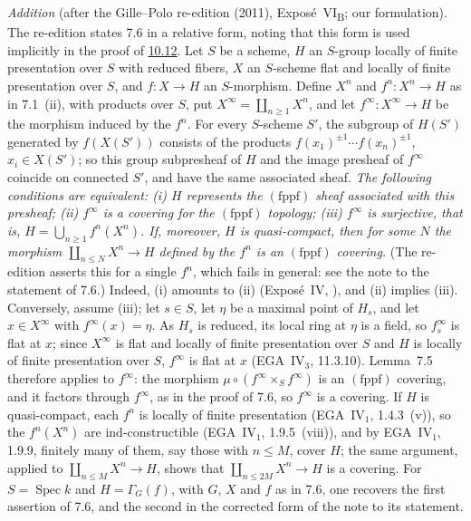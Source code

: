 \medskip\noindent
\emph{Addition} (after the Gille--Polo re-edition (2011), Exposé~VI\textsubscript{B}; our
formulation). The re-edition states 7.6 in a relative form, noting that this form is used implicitly in
the proof of \hyperref[prop:sga3-VIB-10.12]{10.12}. Let \(S\) be a scheme, \(H\) an \(S\)-group locally of
finite presentation over \(S\) with reduced fibers, \(X\) an \(S\)-scheme flat and locally of finite
presentation over \(S\), and \(f\colon X\to H\) an \(S\)-morphism. Define \(X^n\) and \(f^n\colon X^n\to H\)
as in 7.1~(ii), with products over \(S\), put \(X^\infty=\coprod_{n\geq1}X^n\), and let
\(f^\infty\colon X^\infty\to H\) be the morphism induced by the \(f^n\). For every \(S\)-scheme \(S'\), the
subgroup of \(H(S')\) generated by \(f(X(S'))\) consists of the products
\(f(x_1)^{\pm1}\cdots f(x_n)^{\pm1}\), \(x_i\in X(S')\); so this group subpresheaf of \(H\) and the image
presheaf of \(f^\infty\) coincide on connected \(S'\), and have the same associated sheaf. \emph{The following
conditions are equivalent: \textup{(i)} \(H\) represents the \((\mathrm{fppf})\) sheaf associated with this
presheaf; \textup{(ii)} \(f^\infty\) is a covering for the \((\mathrm{fppf})\) topology; \textup{(iii)}
\(f^\infty\) is surjective, that is, \(H=\bigcup_{n\geq1}f^n(X^n)\). If, moreover, \(H\) is quasi-compact,
then for some \(N\) the morphism \(\coprod_{n\leq N}X^n\to H\) defined by the \(f^n\) is an
\((\mathrm{fppf})\) covering.} (The re-edition asserts this for a single \(f^n\), which fails in general:
see the note to the statement of 7.6.) Indeed, (i) amounts to (ii) (Exposé~IV,
), and (ii) implies (iii). Conversely, assume (iii); let
\(s\in S\), let \(\eta\) be a maximal point of \(H_s\), and let \(x\in X^\infty\) with \(f^\infty(x)=\eta\). As
\(H_s\) is reduced, its local ring at \(\eta\) is a field, so \(f^\infty_s\) is flat at \(x\); since
\(X^\infty\) is flat and locally of finite presentation over \(S\) and \(H\) is locally of finite
presentation over \(S\), \(f^\infty\) is flat at \(x\) (EGA~IV\(_3\), 11.3.10). Lemma~7.5 therefore applies to
\(f^\infty\): the morphism \(\mu\circ(f^\infty\times_Sf^\infty)\) is an \((\mathrm{fppf})\) covering, and it
factors through \(f^\infty\), as in the proof of 7.6, so \(f^\infty\) is a covering. If \(H\) is
quasi-compact, each \(f^n\) is locally of finite presentation (EGA~IV\(_1\), 1.4.3~(v)), so the
\(f^n(X^n)\) are ind-constructible (EGA~IV\(_1\), 1.9.5~(viii)), and by EGA~IV\(_1\), 1.9.9, finitely many of
them, say those with \(n\leq M\), cover \(H\); the same argument, applied to
\(\coprod_{n\leq M}X^n\to H\), shows that \(\coprod_{n\leq 2M}X^n\to H\) is a covering. For \(S=\operatorname{Spec}k\)
and \(H=\Gamma_G(f)\), with \(G\), \(X\) and \(f\) as in 7.6, one recovers the first assertion of 7.6, and the
second in the corrected form of the note to its statement.
